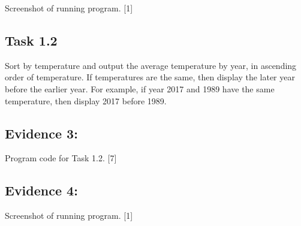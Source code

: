Screenshot of running program.\hfill{} {[}1{]}

\subsection*{Task 1.2 }

Sort by temperature and output the average temperature by year, in
ascending order of temperature. If temperatures are the same, then
display the later year before the earlier year. For example, if year
2017 and 1989 have the same temperature, then display 2017 before
1989. 

\subsection*{Evidence 3:}

Program code for Task 1.2. \hfill{}{[}7{]}

\subsection*{Evidence 4: }

Screenshot of running program. \hfill{}{[}1{]}